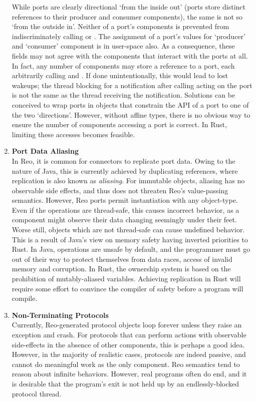 \begin{enumerate}
	While ports are clearly directional `from the inside out' (ports store distinct references to their producer and consumer components), the same is not so `from the outside in'. Neither of a port's components is prevented from indiscriminately calling  or . The assignment of a port's values for `producer' and `consumer' component is in user-space also. As a consequence, these fields may not agree with the components that interact with the ports at all. In fact, any number of components may store a reference to a port, each arbitrarily calling  and . If done unintentionally, this would lead to lost wakeups; the thread blocking for a notification after calling acting on the port is not the same as the thread receiving the notification. Solutions can be conceived to wrap ports in objects that constrain the API of a port to one of the two `directions'. However, without affine types, there is no obvious way to ensure the number of components accessing a port is correct. In Rust, limiting these accesses becomes feasible.
	
	\item \textbf{Port Data Aliasing}\\
	In Reo, it is common for connectors to replicate port data. Owing to the nature of Java, this is currently achieved by duplicating references, where replication is also known as \textit{aliasing}. For immutable objects, aliasing has no observable side effects, and thus does not threaten Reo's value-passing semantics. However, Reo ports permit instantiation with any object-type. Even if the operations are thread-safe, this causes incorrect behavior, as a component might observe their data changing seemingly under their feet. Worse still, objects which are not thread-safe can cause undefined behavior. This is a result of Java's view on memory safety having inverted priorities to Rust. In Java, operations are unsafe by default, and the programmer must go out of their way to protect themselves from data races, access of invalid memory and corruption. In Rust, the ownership system is based on the prohibition of mutably-aliased variables. Achieving replication in Rust will require some effort to convince the compiler of safety before a program will compile.
	
	\item \textbf{Non-Terminating Protocols}\\
	Currently, Reo-generated protocol objects loop forever unless they raise an exception and crash. For protocols that can perform actions with observable side-effects in the absence of other components, this is perhaps a good idea. However, in the majority of realistic cases, protocols are indeed passive, and cannot do meaningful work as the only component. Reo semantics tend to reason about infinite behaviors. However, real programs often do end, and it is desirable that the program's exit is not held up by an endlessly-blocked protocol thread.
	

\end{enumerate}
